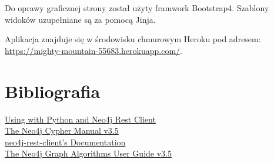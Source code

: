 \documentclass[12pt]{article}
\begin{document}
Do oprawy graficznej strony został użyty framwork Bootstrap4. Szablony widoków uzupełniane są za pomocą Jinja.

Aplikacja znajduje się w środowisku chmurowym Heroku pod adresem:
\url{https://mighty-mountain-55683.herokuapp.com/}.


\section{Bibliografia}
\href{https://devcenter.heroku.com/articles/graphenedb#using-with-python-and-neo4j-rest-client}{Using with Python and Neo4j Rest Client}
\\
\href{https://neo4j.com/docs/cypher-manual/current/}{The Neo4j Cypher Manual v3.5}
\\
\href{https://neo4j-rest-client.readthedocs.io/en/latest/info.html}{neo4j-rest-client’s Documentation}
\\
\href{https://neo4j.com/docs/graph-algorithms/current/}{The Neo4j Graph Algorithms User Guide v3.5}
\end{document}
